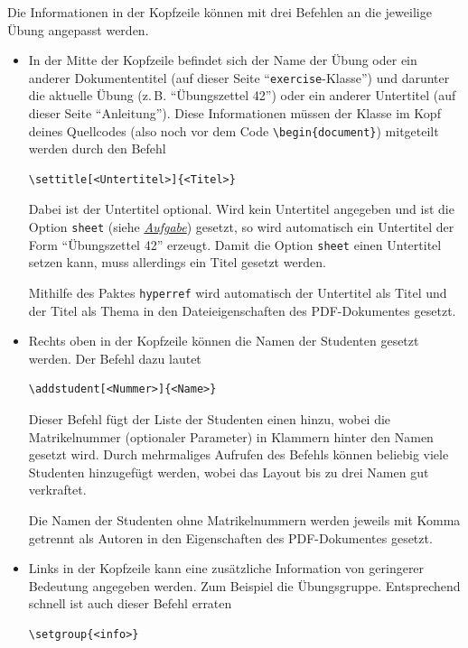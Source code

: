 \documentclass{exercise}
\begin{document}
  \label{section-kopfzeile}
    Die Informationen in der Kopfzeile können mit drei Befehlen an die
    jeweilige Übung angepasst werden.
    \begin{itemize}
      \item In der Mitte der Kopfzeile befindet sich der Name der Übung oder
      ein anderer Dokumententitel (auf dieser Seite
      \enquote{\texttt{exercise}-Klasse}) und darunter die aktuelle Übung
      (z.\,B. \enquote{Übungszettel 42}) oder ein anderer Untertitel (auf dieser
      Seite \enquote{Anleitung}). Diese Informationen müssen der Klasse im Kopf
      deines Quellcodes (also noch vor dem Code \lstinline-\begin{document}-) mitgeteilt
      werden durch den Befehl
        \begin{lstlisting}[gobble=10]
          \settitle[<Untertitel>]{<Titel>}
        \end{lstlisting}

        Dabei ist der Untertitel optional. Wird kein Untertitel angegeben und
        ist die Option \lstinline{sheet} (siehe
        \hyperref[section-aufgaben]{\emph{Aufgabe}}) gesetzt, so wird
        automatisch ein Untertitel der Form \enquote{Übungszettel 42} erzeugt.
        Damit die Option \lstinline{sheet} einen Untertitel setzen kann, muss
        allerdings ein Titel gesetzt werden.

        Mithilfe des Paktes \texttt{hyperref} \cite{hyperref} wird automatisch der Untertitel als Titel und der Titel als Thema in den Dateieigenschaften des PDF-Dokumentes gesetzt.

      \item Rechts oben in der Kopfzeile können die Namen der Studenten gesetzt werden. Der Befehl dazu lautet
      \begin{lstlisting}[gobble=8]
        \addstudent[<Nummer>]{<Name>}
      \end{lstlisting}
      Dieser Befehl fügt der Liste der Studenten einen hinzu, wobei die Matrikelnummer (optionaler Parameter) in Klammern hinter den Namen gesetzt wird. Durch mehrmaliges Aufrufen des Befehls können beliebig viele Studenten hinzugefügt werden, wobei das Layout bis zu drei Namen gut verkraftet.

      Die Namen der Studenten ohne Matrikelnummern werden jeweils mit Komma getrennt als Autoren in den Eigenschaften des PDF-Dokumentes gesetzt.

      \item Links in der Kopfzeile kann eine zusätzliche Information von geringerer Bedeutung angegeben werden. Zum Beispiel die Übungsgruppe. Entsprechend schnell ist auch dieser Befehl erraten
        \begin{lstlisting}[gobble=10]
          \setgroup{<info>}
        \end{lstlisting}
    \end{itemize}
\end{document}
